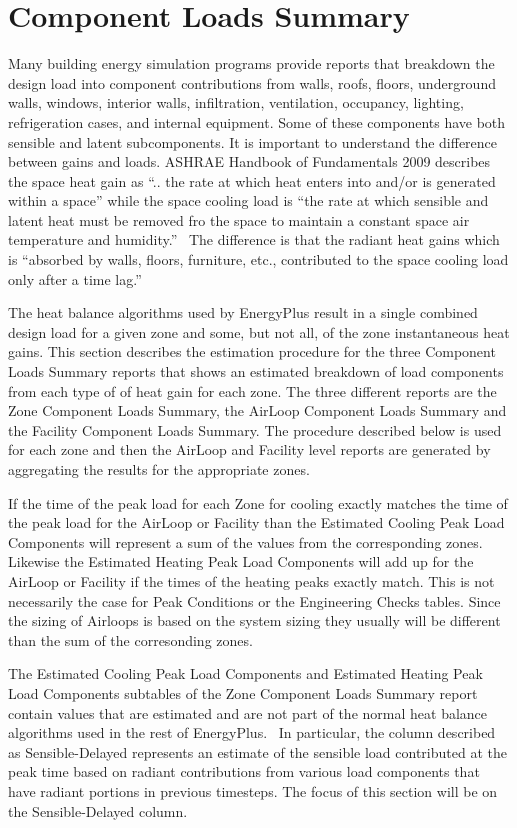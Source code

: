 \section{Component Loads Summary}\label{component-loads-summary}

Many building energy simulation programs provide reports that breakdown the design load into component contributions from walls, roofs, floors, underground walls, windows, interior walls, infiltration, ventilation, occupancy, lighting, refrigeration cases, and internal equipment. Some of these components have both sensible and latent subcomponents. It is important to understand the difference between gains and loads. ASHRAE Handbook of Fundamentals 2009 describes the space heat gain as ``.. the rate at which heat enters into and/or is generated within a space'' while the space cooling load is ``the rate at which sensible and latent heat must be removed fro the space to maintain a constant space air temperature and humidity.''~ The difference is that the radiant heat gains which is ``absorbed by walls, floors, furniture, etc., contributed to the space cooling load only after a time lag.''

The heat balance algorithms used by EnergyPlus result in a single combined design load for a given zone and some, but not all, of the zone instantaneous heat gains. This section describes the estimation procedure for the three Component Loads Summary reports that shows an estimated breakdown of load components from each type of of heat gain for each zone. The three different reports are the Zone Component Loads Summary, the AirLoop Component Loads Summary and the Facility Component Loads Summary. The procedure described below is used for each zone and then the AirLoop and Facility level reports are generated by aggregating the results for the appropriate zones.

If the time of the peak load for each Zone for cooling exactly matches the time of the peak load for the AirLoop or Facility than the Estimated Cooling Peak Load Components will represent a sum of the values from the corresponding zones. Likewise the Estimated Heating Peak Load Components will add up for the AirLoop or Facility if the times of the heating peaks exactly match. This is not necessarily the case for Peak Conditions or the Engineering Checks tables. Since the sizing of Airloops is based on the system sizing they usually will be different than the sum of the corresonding zones. 

The Estimated Cooling Peak Load Components and Estimated Heating Peak Load Components subtables of the Zone Component Loads Summary report contain values that are estimated and are not part of the normal heat balance algorithms used in the rest of EnergyPlus.~ In particular, the column described as Sensible-Delayed represents an estimate of the sensible load contributed at the peak time based on radiant contributions from various load components that have radiant portions in previous timesteps. The focus of this section will be on the Sensible-Delayed column.

